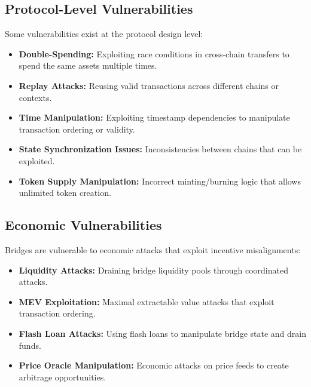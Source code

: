 \documentclass[runningheads]{llncs}
\begin{document}
\subsection{Protocol-Level Vulnerabilities}
Some vulnerabilities exist at the protocol design level:

\begin{itemize}
    \item \textbf{Double-Spending:} Exploiting race conditions in cross-chain transfers to spend the same assets multiple times.
    
    \item \textbf{Replay Attacks:} Reusing valid transactions across different chains or contexts.
    
    \item \textbf{Time Manipulation:} Exploiting timestamp dependencies to manipulate transaction ordering or validity.
    
    \item \textbf{State Synchronization Issues:} Inconsistencies between chains that can be exploited.
    
    \item \textbf{Token Supply Manipulation:} Incorrect minting/burning logic that allows unlimited token creation.
\end{itemize}

\subsection{Economic Vulnerabilities}
Bridges are vulnerable to economic attacks that exploit incentive misalignments:

\begin{itemize}
    \item \textbf{Liquidity Attacks:} Draining bridge liquidity pools through coordinated attacks.
    
    \item \textbf{MEV Exploitation:} Maximal extractable value attacks that exploit transaction ordering.
    
    \item \textbf{Flash Loan Attacks:} Using flash loans to manipulate bridge state and drain funds.
    
    \item \textbf{Price Oracle Manipulation:} Economic attacks on price feeds to create arbitrage opportunities.
\end{itemize}
\end{document}
